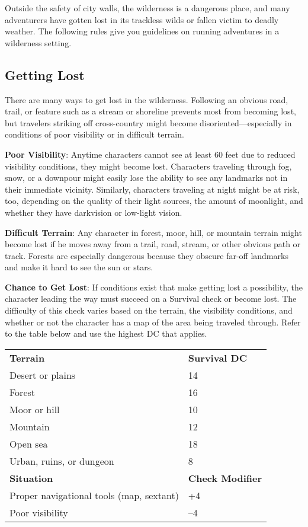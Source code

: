 				
Outside the safety of city walls, the wilderness is a dangerous place, and many adventurers have gotten lost in its trackless wilds or fallen victim to deadly weather. The following rules give you guidelines on running adventures in a wilderness setting.
				
\subsection{Getting Lost}

				
There are many ways to get lost in the wilderness. Following an obvious road, trail, or feature such as a stream or shoreline prevents most from becoming lost, but travelers striking off cross-country might become disoriented---especially in conditions of poor visibility or in difficult terrain. 
				
\textbf{Poor Visibility}: Anytime characters cannot see at least 60 feet due to reduced visibility conditions, they might become lost. Characters traveling through fog, snow, or a downpour might easily lose the ability to see any landmarks not in their immediate vicinity. Similarly, characters traveling at night might be at risk, too, depending on the quality of their light sources, the amount of moonlight, and whether they have darkvision or low-light vision.
				
\textbf{Difficult Terrain}: Any character in forest, moor, hill, or mountain terrain might become lost if he moves away from a trail, road, stream, or other obvious path or track. Forests are especially dangerous because they obscure far-off landmarks and make it hard to see the sun or stars.
				
\textbf{Chance to Get Lost}: If conditions exist that make getting lost a possibility, the character leading the way must succeed on a Survival check or become lost. The difficulty of this check varies based on the terrain, the visibility conditions, and whether or not the character has a map of the area being traveled through. Refer to the table below and use the highest DC that applies.

\begin{tabular}{ll}
\textbf{Terrain} & \textbf{Survival DC} \\
Desert or plains & 14\\
Forest & 16\\
Moor or hill & 10\\
Mountain & 12\\
Open sea & 18\\
Urban, ruins, or dungeon & 8\\
 \textbf{Situation} & \textbf{Check Modifier}\\
Proper navigational tools (map, sextant) & +4\\
Poor visibility & --4\\
\end{tabular}

